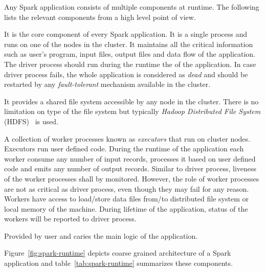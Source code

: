 Any Spark application consists of multiple components at runtime. The following lists the relevant components from a high level point of view.
\begin{description}[leftmargin=0pt]
    \item[Driver Process Driver] It is the core component of every Spark application. It is a single process and runs on one of the nodes in the cluster. It maintains all the critical information such as user's program, input files, output files and data flow of the application. The driver process should run during the runtime the of the application. In case driver process fails, the whole application is considered as \emph{dead} and should be restarted by any \emph{fault-tolerant} mechanism available in the cluster.
    \item[Distributed File System] It provides a shared file system accessible by any node in the cluster. There is no limitation on type of the file system but typically \emph{Hadoop Distributed File System} (HDFS)~\cite{hadoop} is used.
    \item[Worker Processes] A collection of worker processes known as \emph{executors} that run on cluster nodes. Executors run user defined code. During the runtime of the application each worker consume any number of input records, processes it based on user defined code and emits any number of output records. Similar to driver process, liveness of the worker processes shall by monitored. However, the role of worker processes are not as critical as driver process, even though they may fail for any reason. Workers have access to load/store data files from/to distributed file system or local memory of the machine. During lifetime of the application, status of the workers will be reported to driver process.
    \item[User Defined Code] Provided by user and caries the main logic of the application.
\end{description}
Figure~\ref{fig:spark-runtime} depicts coarse grained architecture of a Spark application and table~\ref{tab:spark-runtime} summarizes these components.

